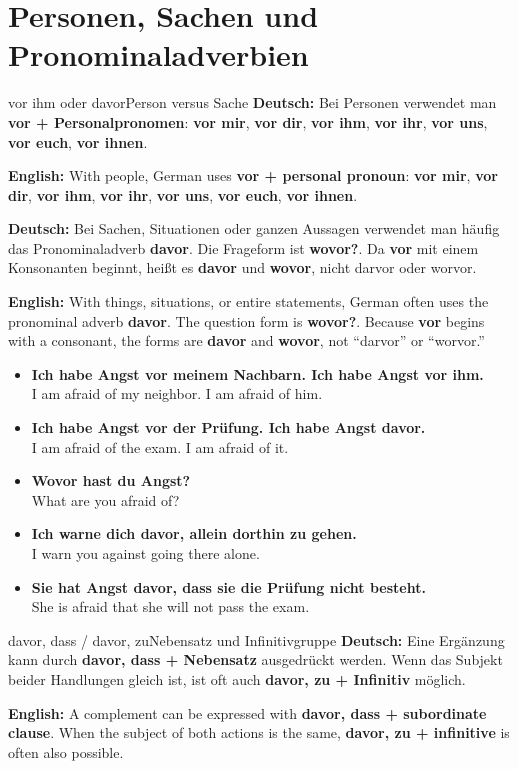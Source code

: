 \documentclass[a4paper,11pt]{article}
\newcommand{\GermanText}[1]{\textbf{Deutsch: }#1\par}
\newcommand{\EnglishText}[1]{{\small\color{SoftGray}\textbf{English: }#1\par}}
\newcommand{\ExampleItem}[2]{\item \textbf{#1}\\{\small\color{SoftGray}#2}}
\begin{document}
    \section{Personen, Sachen und Pronominaladverbien}

        \begin{grammarentry}{vor ihm oder davor}{Person versus Sache}
            \GermanText{Bei Personen verwendet man \textbf{vor + Personalpronomen}: \textbf{vor mir}, \textbf{vor dir}, \textbf{vor ihm}, \textbf{vor ihr}, \textbf{vor uns}, \textbf{vor euch}, \textbf{vor ihnen}.}
            \EnglishText{With people, German uses \textbf{vor + personal pronoun}: \textbf{vor mir}, \textbf{vor dir}, \textbf{vor ihm}, \textbf{vor ihr}, \textbf{vor uns}, \textbf{vor euch}, \textbf{vor ihnen}.}

            \GermanText{Bei Sachen, Situationen oder ganzen Aussagen verwendet man häufig das Pronominaladverb \textbf{davor}. Die Frageform ist \textbf{wovor?}. Da \textbf{vor} mit einem Konsonanten beginnt, heißt es \textbf{davor} und \textbf{wovor}, nicht \glqq darvor\grqq{} oder \glqq worvor\grqq.}
            \EnglishText{With things, situations, or entire statements, German often uses the pronominal adverb \textbf{davor}. The question form is \textbf{wovor?}. Because \textbf{vor} begins with a consonant, the forms are \textbf{davor} and \textbf{wovor}, not ``darvor'' or ``worvor.''}
        \end{grammarentry}

        \begin{exbox}
            \begin{itemize}
                \ExampleItem{Ich habe Angst vor meinem Nachbarn. Ich habe Angst vor ihm.}{I am afraid of my neighbor. I am afraid of him.}
                \ExampleItem{Ich habe Angst vor der Prüfung. Ich habe Angst davor.}{I am afraid of the exam. I am afraid of it.}
                \ExampleItem{Wovor hast du Angst?}{What are you afraid of?}
                \ExampleItem{Ich warne dich davor, allein dorthin zu gehen.}{I warn you against going there alone.}
                \ExampleItem{Sie hat Angst davor, dass sie die Prüfung nicht besteht.}{She is afraid that she will not pass the exam.}
            \end{itemize}
        \end{exbox}

        \begin{grammarentry}{davor, dass / davor, zu}{Nebensatz und Infinitivgruppe}
            \GermanText{Eine Ergänzung kann durch \textbf{davor, dass + Nebensatz} ausgedrückt werden. Wenn das Subjekt beider Handlungen gleich ist, ist oft auch \textbf{davor, zu + Infinitiv} möglich.}
            \EnglishText{A complement can be expressed with \textbf{davor, dass + subordinate clause}. When the subject of both actions is the same, \textbf{davor, zu + infinitive} is often also possible.}
        \end{grammarentry}
\end{document}
